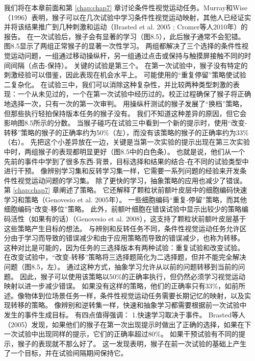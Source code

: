 我们将在本章前面和第 \ref{chap:chap7} 章讨论条件性视觉运动任务。Murray和Wise（1996）表明，猴子可以在几次试验中学习条件性视觉运动映射，其他人已经证实并将该结果推广到几种刺激和运动（Brasted et al. 2005 ; Cromer等人2010年）的报告。
在一次试验后，猴子会有显著的学习（图8.5），此后猴子通常不会犯错。
图8.5显示了两组正常猴子的显著一次性学习。
两组都解决了三个选择的条件性视觉运动问题，一组通过移动操纵杆，另一组通过点击或保持与触摸屏接触不同的时间间隔（点击-保持）。
关键的试验是第三个。
在第一次试验中，猴子没有特定的刺激经验可以借鉴，因此表现在机会水平上。
可能使用的“重复停留”策略使试验二复杂化。
在试验三中，我们可以消除这种复杂性，并比较两种类型刺激的表现：一个从未见过的，一个在第一次试验中经历过的。校正过程确保了猴子将正确地选择一次，只有一次的第一次审判。
用操纵杆测试的猴子发展了“换档”策略，但那些执行轻拍保持版本任务的猴子没有。
我们不知道这种差异的原因，但它会影响图8.5所示的分数。
当猴子碰巧在试验三中看到一个新的提示时，使用“改变-转移”策略的猴子的正确率约为50$\%$（左），而没有该策略的猴子的正确率约为33$\%$（右）。
先把这个小差异放在一边，关键是当第一次实验的提示出现在第三次实验中时，两组猴子的表现都明显更好（图8.5中的白色条）。
也就是说，他们从一个先前的事件中学到了很多东西-背景，目标选择和结果的结合-在不同的试验类型中进行干预。
像辨别学习集和反转学习集一样，它需要一系列问题的经验来开发条件性视觉运动问题的学习集。
除了更快的学习，抽象策略的应用也减少了错误。
第 \ref{chap:chap7} 章阐述了策略。
它还解释了颗粒状前额叶皮层中的细胞编码快速学习和策略（Genovesio et al. 2005年）。
一些细胞编码“重复-停留”策略，而其他细胞编码“改变-移位”策略。
此外，前额叶细胞在错误试验中显示出较少的策略编码活性（如果有的话）（Genovesio et al. 2008），这支持了颗粒状前额叶皮层基于这些策略产生目标的想法。
与辨别和反转任务不同，条件性视觉运动任务允许区分由于学习而导致的错误减少和由于应用策略而导致的错误减少，也称为转移。
这种对比是可能的，因为任务的三选择版本有两种试验：重复试验和改变试验。
在改变试验中，“改变-转移”策略将三选择题简化为二选择题，但并不能完全解决问题（图8.5，左）。
通过这种方式，抽象学习允许从以前的问题转移到当前的问题。
因此，猴子可以使用该策略以50$\%$的正确率执行，但仍然必须学习视觉运动映射以进一步减少错误。
如果没有这样的策略，他们的正确率只有33$\%$，如前所述。像物体到位场景任务一样，条件性视觉运动任务需要长期记忆的映射，以及实现转移的策略。
像辨别和逆转集一样，快速和抽象学习都需要根据前一次试验中发生的事件生成目标。
有四点值得强调：
1.快速学习取决于事件。
Brasted等人（2005）发现，如果他们的猴子在第一次出现提示时做出了正确的选择，如果在下一次试验中出现同样的提示，它们的正确率超过80$\%$。
如果干预试验有不同的提示，猴子的表现就不那么好了。
这一发现表明，猴子在前一次试验的基础上产生了一个目标，并在试验间隔期间保持它。
